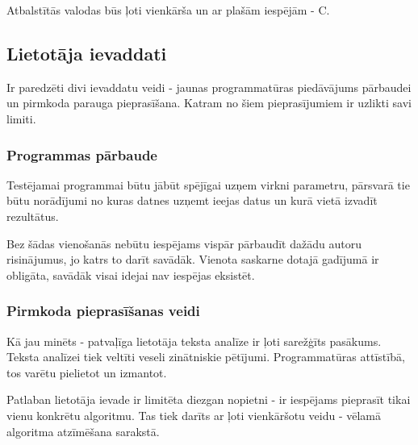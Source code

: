 Atbalstītās valodas būs ļoti vienkārša un ar plašām iespējām - C.

\subsection{Lietotāja ievaddati}
Ir paredzēti divi ievaddatu veidi - jaunas programmatūras piedāvājums pārbaudei un pirmkoda parauga pieprasīšana. Katram no šiem pieprasījumiem ir uzlikti savi limiti.

\subsubsection{Programmas pārbaude}
Testējamai programmai būtu jābūt spējīgai uzņem virkni parametru, pārsvarā tie būtu norādījumi no kuras datnes uzņemt ieejas datus un kurā vietā izvadīt rezultātus. 

Bez šādas vienošanās nebūtu iespējams vispār pārbaudīt dažādu autoru risinājumus, jo katrs to darīt savādāk. Vienota saskarne dotajā gadījumā ir obligāta, savādāk visai idejai nav iespējas eksistēt. 

\subsubsection{Pirmkoda pieprasīšanas veidi}
Kā jau minēts - patvaļīga lietotāja teksta analīze ir ļoti sarežģīts pasākums. Teksta analīzei tiek veltīti veseli zinātniskie pētījumi. Programmatūras attīstībā, tos varētu pielietot un izmantot. 

Patlaban lietotāja ievade ir limitēta diezgan nopietni - ir iespējams pieprasīt tikai vienu konkrētu algoritmu. Tas tiek darīts ar ļoti vienkāršotu veidu - vēlamā algoritma atzīmēšana sarakstā. 
